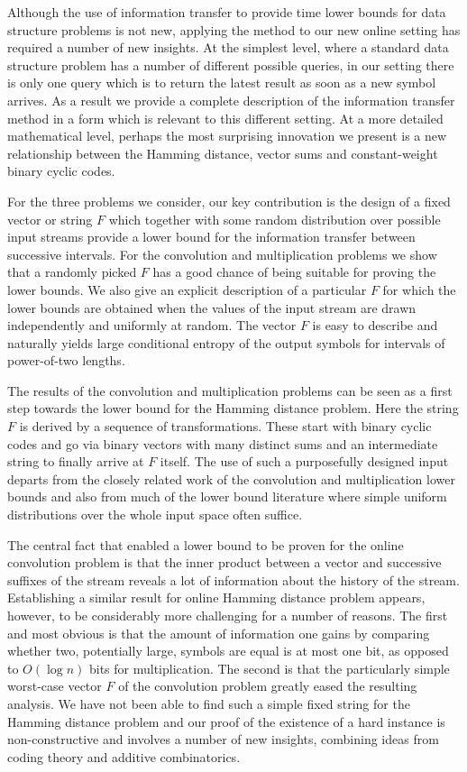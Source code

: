 \documentclass[11pt]{article}
\numberwithin{equation}{section}
\theoremstyle{definition}
\theoremstyle{plain}
\begin{document}
Although the use of information transfer to provide time lower bounds for data structure problems is not new,  applying the method to our new online setting has required a number of new insights. At the simplest level, where a standard data structure problem has a number of different possible queries, in our setting there is only one query which is to return the latest result as soon as a  new symbol arrives. As a result we provide a complete description of the information transfer method in a form which is relevant to this different setting.  At a more detailed mathematical level, perhaps the most surprising innovation we present is a new relationship between the Hamming distance, vector sums and
%
constant-weight   %
binary cyclic codes.

For the three problems we consider, our key contribution is the design of a fixed vector or string $F$ 
which together with some random distribution over possible input streams provide a lower bound for the information transfer between successive intervals.
For the convolution and multiplication problems we show that a randomly picked $F$ has a good chance of being suitable for proving the lower bounds. We also give an explicit description of a particular $F$ for which the lower bounds are obtained when the values of the input stream are drawn independently and uniformly at random. The vector $F$ is easy to describe and naturally yields large conditional entropy of the output symbols for intervals of power-of-two lengths.

The results of the convolution and multiplication problems can be seen as a first step towards the lower bound for the Hamming distance problem.
Here the string $F$ is derived by a sequence of transformations. These start with binary cyclic codes and go via binary vectors with many 
distinct sums and an intermediate string to finally arrive at $F$ itself.
The use of such a purposefully designed input departs from the closely related work of the convolution and multiplication lower bounds and also from much of the lower bound literature where simple uniform distributions over the whole input space often suffice.
%

The central fact that enabled a lower bound to be proven for the online convolution problem is that the inner product  between a vector and successive suffixes of the stream reveals a lot of information about the history of the stream.  Establishing a similar result for online Hamming distance problem appears, however, to be considerably more challenging for a number of reasons.
The first and most obvious is that the amount of information one gains by comparing whether two, potentially large, symbols are equal is at most one bit, as opposed to $O(\log{n})$ bits for multiplication.
The second is that the particularly simple worst-case vector $F$ of the convolution problem greatly eased the resulting analysis.
We have not been able to find such a simple fixed string for the Hamming distance problem and our proof of the existence of a hard instance is non-constructive and involves a number of new insights, combining ideas from coding theory and additive combinatorics.
\end{document}
